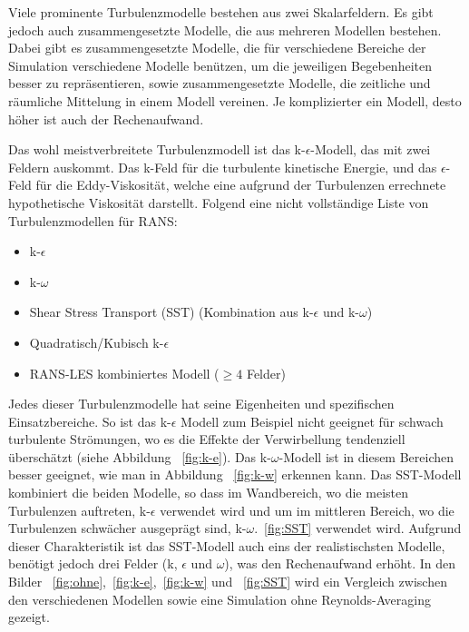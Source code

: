 \begin{refsection}
Viele prominente Turbulenzmodelle bestehen aus zwei Skalarfeldern.
Es gibt jedoch auch zusammengesetzte Modelle, die aus mehreren Modellen bestehen.
Dabei gibt es zusammengesetzte Modelle, die für verschiedene Bereiche der Simulation verschiedene Modelle benützen,
um die jeweiligen Begebenheiten besser zu repräsentieren,
sowie zusammengesetzte Modelle, die zeitliche und räumliche Mittelung in einem Modell vereinen.
Je komplizierter ein Modell, desto höher ist auch der Rechenaufwand.

Das wohl meistverbreitete Turbulenzmodell ist das k-$\epsilon$-Modell, das mit zwei Feldern auskommt. Das k-Feld für die
turbulente kinetische Energie, und das $\epsilon$-Feld für die Eddy-Viskosität, welche eine aufgrund der Turbulenzen errechnete
hypothetische Viskosität darstellt.
Folgend eine nicht vollständige Liste von Turbulenzmodellen für RANS:

\begin{itemize}
    \item k-$\epsilon$
    \item k-$\omega$
    \item Shear Stress Transport (SST) (Kombination aus k-$\epsilon$ und k-$\omega$)
    \item Quadratisch/Kubisch k-$\epsilon$
    \item RANS-LES kombiniertes Modell ($\ge 4$ Felder)
\end{itemize}

Jedes dieser Turbulenzmodelle hat seine Eigenheiten und spezifischen Einsatzbereiche.
So ist das k-$\epsilon$ Modell zum Beispiel nicht geeignet für schwach turbulente Strömungen,
wo es die Effekte der Verwirbellung tendenziell überschätzt (siehe Abbildung ~\ref{fig:k-e}).
Das k-$\omega$-Modell ist in diesem Bereichen besser geeignet, wie man in Abbildung ~\ref{fig:k-w}
erkennen kann. Das SST-Modell kombiniert die beiden Modelle, so dass im Wandbereich,
wo die meisten Turbulenzen auftreten, k-$\epsilon$ verwendet wird und um im mittleren Bereich,
wo die Turbulenzen schwächer ausgeprägt sind, k-$\omega$.~\ref{fig:SST} verwendet wird.
Aufgrund dieser Charakteristik ist das SST-Modell auch eins der realistischsten Modelle,
benötigt jedoch drei Felder (k, $\epsilon$ und $\omega$), was den Rechenaufwand erhöht.
In den Bilder ~\ref{fig:ohne},~\ref{fig:k-e},~\ref{fig:k-w} und ~\ref{fig:SST}
wird ein Vergleich zwischen den verschiedenen Modellen sowie eine Simulation ohne
Reynolds-Averaging gezeigt.


\end{refsection}
